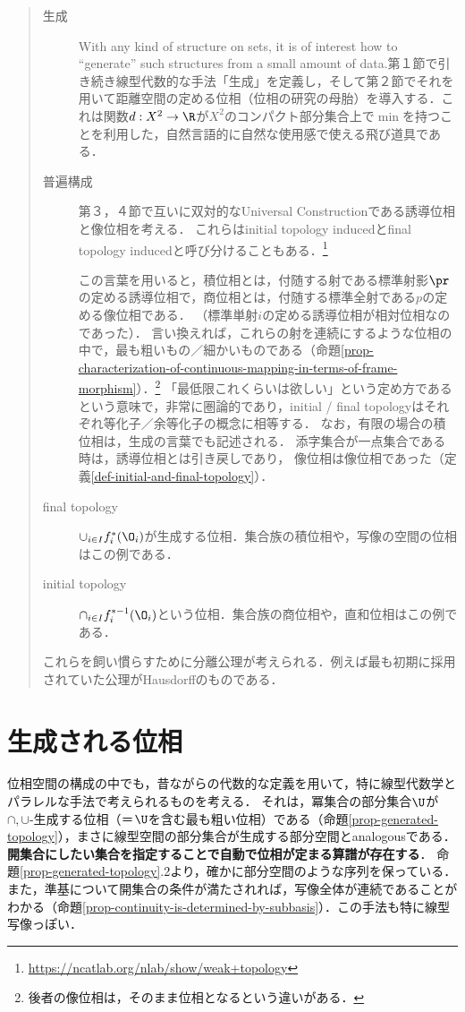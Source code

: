 \documentclass[uplatex,dvipdfmx]{jsreport}
\begin{document}
\begin{quotation}
    \begin{description}
        \item[生成] 
        With any kind of structure on sets, it is of interest how to “generate” such structures from a small amount of data.\cite{nLab}第１節で引き続き線型代数的な手法「生成」を定義し，そして第２節でそれを用いて距離空間の定める位相（位相の研究の母胎）を導入する．これは関数$d:X^2\to\R$が$X^2$のコンパクト部分集合上で$\min$を持つことを利用した，自然言語的に自然な使用感で使える飛び道具である．
        \item[普遍構成] 
        第３，４節で互いに双対的なUniversal Constructionである誘導位相と像位相を考える．
        これらはinitial topology inducedとfinal topology inducedと呼び分けることもある．\footnote{\url{https://ncatlab.org/nlab/show/weak+topology}}
        
        この言葉を用いると，積位相とは，付随する射である標準射影$\pr$の定める誘導位相で，商位相とは，付随する標準全射である$p$の定める像位相である．
        （標準単射$i$の定める誘導位相が相対位相なのであった）．
        言い換えれば，これらの射を連続にするような位相の中で，最も粗いもの／細かいものである（命題\ref{prop-characterization-of-continuous-mapping-in-terms-of-frame-morphism}）．\footnote{後者の像位相は，そのまま位相となるという違いがある．}
        「最低限これくらいは欲しい」という定め方であるという意味で，非常に圏論的であり，initial / final topologyはそれぞれ等化子／余等化子の概念に相等する．
        なお，有限の場合の積位相は，生成の言葉でも記述される．
        添字集合が一点集合である時は，誘導位相とは引き戻しであり，
        像位相は像位相であった（定義\ref{def-initial-and-final-topology}）．
        \item[final topology] $\cup_{i\in I}f_i^*(\O_i)$が生成する位相．集合族の積位相や，写像の空間の位相はこの例である．
        \item[initial topology] $\cap_{i\in I}f_i^{*-1}(\O_i)$という位相．集合族の商位相や，直和位相はこの例である．
    \end{description}
    これらを飼い慣らすために分離公理が考えられる．例えば最も初期に採用されていた公理がHausdorffのものである．
\end{quotation}

\section{生成される位相}

\begin{screen}
    位相空間の構成の中でも，昔ながらの代数的な定義を用いて，特に線型代数学とパラレルな手法で考えられるものを考える．
    それは，冪集合の部分集合$\U$が$\cap,\cup$-生成する位相（＝$\U$を含む最も粗い位相）である（命題\ref{prop-generated-topology}），まさに線型空間の部分集合が生成する部分空間とanalogousである．
    \textbf{開集合にしたい集合を指定することで自動で位相が定まる算譜が存在する}．
    命題\ref{prop-generated-topology}.2より，確かに部分空間のような序列を保っている．
    また，準基について開集合の条件が満たされれば，写像全体が連続であることがわかる（命題\ref{prop-continuity-is-determined-by-subbasis}）．この手法も特に線型写像っぽい．
\end{screen}
\end{document}
